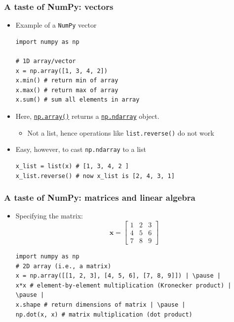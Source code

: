 \documentclass[xcolor=table]{beamer}
\begin{document}
\begin{frame}[fragile]
\frametitle{A taste of NumPy: vectors}
    \begin{itemize}
        \item Example of a \texttt{NumPy} vector
\begin{lstlisting}[style=python]
import numpy as np

# 1D array/vector
x = np.array([1, 3, 4, 2])
x.min() # return min of array 
x.max() # return max of array
x.sum() # sum all elements in array
\end{lstlisting}
\pause 
    \item Here, \href{https://docs.scipy.org/doc/numpy/reference/generated/numpy.array.html#numpy.array}{\texttt{np.array()}} returns a \href{https://docs.scipy.org/doc/numpy/reference/generated/numpy.ndarray.html#numpy.ndarray}{\texttt{np.ndarray}} object. 
        \pause
        \begin{itemize}
            \item Not a list, hence operations like \texttt{list.reverse()} do not work
        \end{itemize}
            \pause
    \item Easy, however, to cast \texttt{np.ndarray} to a list
        \pause 
\begin{lstlisting}[style=python]
x_list = list(x) # [1, 3, 4, 2 ]
x_list.reverse() # now x_list is [2, 4, 3, 1]
\end{lstlisting}
    \end{itemize}
\end{frame}

\begin{frame}[fragile]
\frametitle{A taste of NumPy: matrices and linear algebra}
    \begin{itemize}
        \item Specifying the matrix:
            $$ \mathbf{x} =  \left [ \begin{array}{ccc} 
                1 & 2 & 3 \\
                4 & 5 & 6 \\
                7 & 8 & 9 
            \end{array} \right ] $$ \pause
\begin{lstlisting}[style=python]
import numpy as np
# 2D array (i.e., a matrix)
x = np.array([[1, 2, 3], [4, 5, 6], [7, 8, 9]]) | \pause |
x*x # element-by-element multiplication (Kronecker product) | \pause |
x.shape # return dimensions of matrix | \pause |
np.dot(x, x) # matrix multiplication (dot product)
\end{lstlisting}
    \end{itemize}
\end{frame}
\end{document}
